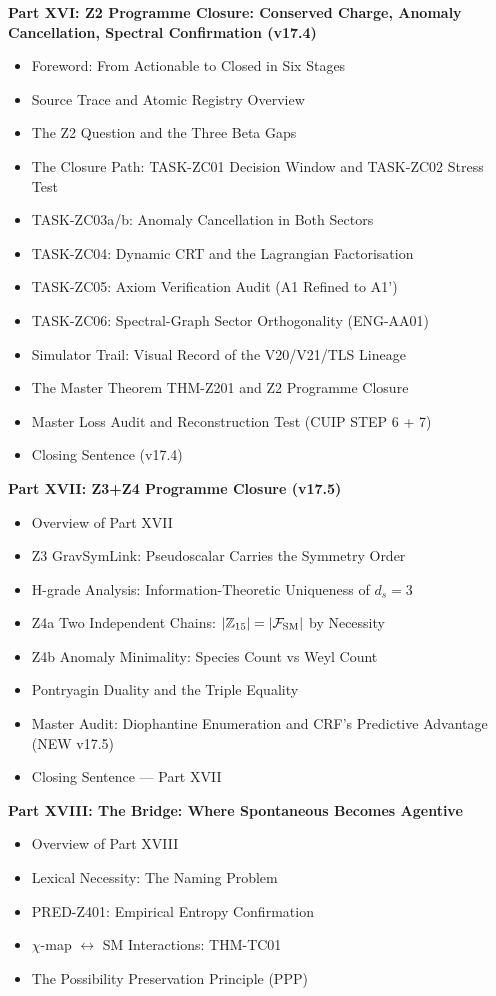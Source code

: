 \documentclass[11pt, a4paper]{article}
\begin{document}
\begin{contentsbox}[title={Part C --- Part and Section Headers}]
\textbf{Part XVI: Z2 Programme Closure: Conserved Charge, Anomaly Cancellation, Spectral Confirmation (v17.4)}
\begin{itemize}[noitemsep,leftmargin=1.5em]
  \item Foreword: From Actionable to Closed in Six Stages
  \item Source Trace and Atomic Registry Overview
  \item The Z2 Question and the Three Beta Gaps
  \item The Closure Path: TASK-ZC01 Decision Window and TASK-ZC02 Stress Test
  \item TASK-ZC03a/b: Anomaly Cancellation in Both Sectors
  \item TASK-ZC04: Dynamic CRT and the Lagrangian Factorisation
  \item TASK-ZC05: Axiom Verification Audit (A1 Refined to A1')
  \item TASK-ZC06: Spectral-Graph Sector Orthogonality (ENG-AA01)
  \item Simulator Trail: Visual Record of the V20/V21/TLS Lineage
  \item The Master Theorem THM-Z201 and Z2 Programme Closure
  \item Master Loss Audit and Reconstruction Test (CUIP STEP 6 + 7)
  \item Closing Sentence (v17.4)
\end{itemize}

\textbf{Part XVII: Z3+Z4 Programme Closure (v17.5)}
\begin{itemize}[noitemsep,leftmargin=1.5em]
  \item Overview of Part XVII
  \item Z3 GravSymLink: Pseudoscalar Carries the Symmetry Order
  \item H-grade Analysis: Information-Theoretic Uniqueness of $d_s = 3$
  \item Z4a Two Independent Chains: $|\mathbb{Z}_{15}| = |\mathcal{F}_{\rm SM}|$ by Necessity
  \item Z4b Anomaly Minimality: Species Count vs Weyl Count
  \item Pontryagin Duality and the Triple Equality
  \item Master Audit: Diophantine Enumeration and CRF's Predictive Advantage (NEW v17.5)
  \item Closing Sentence --- Part XVII
\end{itemize}

\textbf{Part XVIII: The Bridge: Where Spontaneous Becomes Agentive}
\begin{itemize}[noitemsep,leftmargin=1.5em]
  \item Overview of Part XVIII
  \item Lexical Necessity: The Naming Problem
  \item PRED-Z401: Empirical Entropy Confirmation
  \item $\chi$-map $\leftrightarrow$ SM Interactions: THM-TC01
  \item The Possibility Preservation Principle (PPP)
\end{itemize}


\end{contentsbox}
\end{document}
